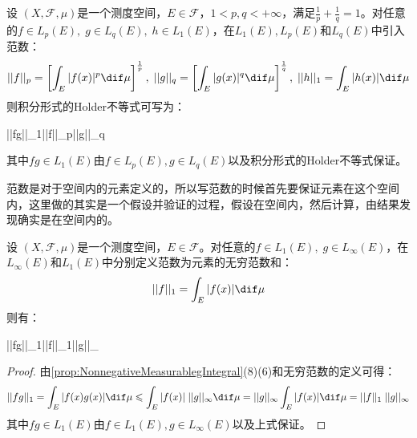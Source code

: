 \begin{theorem}
	设	$(X,\mathscr{F},\mu)$是一个测度空间，$E\in\mathscr{F}$，$1<p,q<+\infty$，满足$\frac{1}{p}+\frac{1}{q}=1$。对任意的$f\in L_p(E),\;g\in L_q(E),\;h\in L_1(E)$，在$L_1(E),L_p(E)$和$L_q(E)$中引入范数：
	\begin{equation*}
		||f||_p=\left[\int_{E}^{}|f(x)|^p\dif\mu\right]^\frac{1}{p},\;||g||_q=\left[\int_{E}|g(x)|^q\dif\mu\right]^{\frac{1}{q}},\;||h||_1=\int_{E}|h(x)|\dif\mu
	\end{equation*}
	则积分形式的Holder不等式可写为：
	\begin{inequality*}\label{ineq:holder-ineq-norm}
		||fg||_1\leqslant||f||_p\;||g||_q
	\end{inequality*}
	其中$fg\in L_1(E)$由$f\in L_p(E),g\in L_q(E)$以及积分形式的Holder不等式保证。
\end{theorem}
\begin{note}
	范数是对于空间内的元素定义的，所以写范数的时候首先要保证元素在这个空间内，这里做的其实是一个假设并验证的过程，假设在空间内，然后计算，由结果发现确实是在空间内的。
\end{note}
\begin{theorem}
	设	$(X,\mathscr{F},\mu)$是一个测度空间，$E\in\mathscr{F}$。对任意的$f\in L_1(E),\;g\in L_{\infty}(E)$，在$L_{\infty}(E)$和$L_1(E)$中分别定义范数为元素的无穷范数和：
	\begin{equation*}
		||f||_1=\int_{E}|f(x)|\dif\mu
	\end{equation*}
	则有：
	\begin{inequality*}\label{ineq:holder-ineq-norm+infty}
		||fg||_1\leqslant||f||_1\;||g||_{\infty}
	\end{inequality*}
\end{theorem}
\begin{proof}
	由\cref{prop:NonnegativeMeasurablegIntegral}(8)(6)和无穷范数的定义可得：
	\begin{equation*}
		||fg||_1=\int_{E}|f(x)g(x)|\dif\mu\leqslant\int_{E}|f(x)|\;||g||_{\infty}\dif\mu=||g||_{\infty}\int_{E}|f(x)|\dif\mu=||f||_1\;||g||_{\infty}\qedhere
	\end{equation*}
	其中$fg\in L_1(E)$由$f\in L_1(E),g\in L_{\infty}(E)$以及上式保证。
\end{proof}






